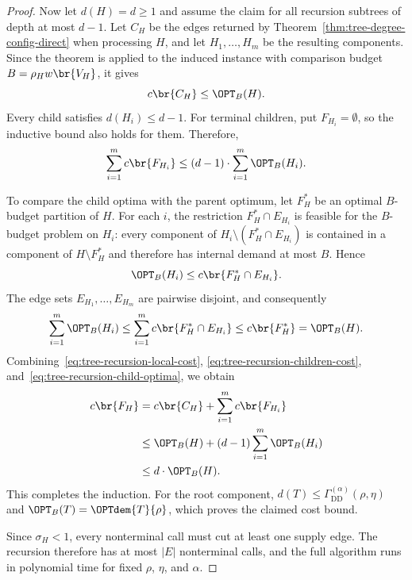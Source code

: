 \begin{proof}
    Now let $d(H)=d\geq1$ and assume the claim for all recursion subtrees of depth at most $d-1$. Let $C_H$ be the edges returned by Theorem~\ref{thm:tree-degree-config-direct} when processing $H$, and let $H_1,\ldots,H_m$ be the resulting components. Since the theorem is applied to the induced instance with comparison budget $B=\rho_H w\br{V_H}$, it gives
    \begin{equation}\label{eq:tree-recursion-local-cost}
        c\br{C_H}\leq\OPT_B(H).
    \end{equation}
    Every child satisfies $d(H_i)\leq d-1$. For terminal children, put $F_{H_i}=\emptyset$, so the inductive bound also holds for them. Therefore,
    \begin{equation}\label{eq:tree-recursion-children-cost}
        \sum_{i=1}^{m}c\br{F_{H_i}}
        \leq(d-1)\cdot \sum_{i=1}^{m}\OPT_B(H_i).
    \end{equation}

    To compare the child optima with the parent optimum, let $F_H^*$ be an optimal $B$-budget partition of $H$. For each $i$, the restriction $F_H^*\cap E_{H_i}$ is feasible for the $B$-budget problem on $H_i$: every component of $H_i\setminus(F_H^*\cap E_{H_i})$ is contained in a component of $H\setminus F_H^*$ and therefore has internal demand at most $B$. Hence
    \[
        \OPT_B(H_i)\leq c\br{F_H^*\cap E_{H_i}}.
    \]
    The edge sets $E_{H_1},\ldots,E_{H_m}$ are pairwise disjoint, and consequently
    \begin{equation}\label{eq:tree-recursion-child-optima}
        \sum_{i=1}^{m}\OPT_B(H_i)
        \leq\sum_{i=1}^{m}c\br{F_H^*\cap E_{H_i}}
        \leq c\br{F_H^*}
        =\OPT_B(H).
    \end{equation}
    Combining~\eqref{eq:tree-recursion-local-cost}, \eqref{eq:tree-recursion-children-cost}, and~\eqref{eq:tree-recursion-child-optima}, we obtain
    \begin{align*}
        c\br{F_H}
        &=c\br{C_H}+\sum_{i=1}^{m}c\br{F_{H_i}}\\
        &\leq\OPT_B(H)+(d-1)\sum_{i=1}^{m}\OPT_B(H_i)\\
        &\leq d\cdot\OPT_B(H).
    \end{align*}
    This completes the induction. For the root component, $d(T)\leq\Gamma_{\mathrm{DD}}^{(\alpha)}(\rho,\eta)$ and $\OPT_B(T)=\OPTdem{T}{\rho}$, which proves the claimed cost bound.

    Since $\sigma_H<1$, every nonterminal call must cut at least one supply edge. The recursion therefore has at most $|E|$ nonterminal calls, and the full algorithm runs in polynomial time for fixed $\rho$, $\eta$, and $\alpha$.
\end{proof}

